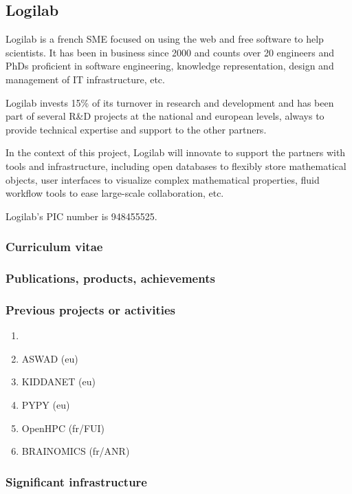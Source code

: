 \subsection*{Logilab}

Logilab is a french SME focused on using the web and free software to help
scientists. It has been in business since 2000 and counts over 20 engineers and
PhDs proficient in software engineering, knowledge representation, design and
management of IT infrastructure, etc.

Logilab invests 15\% of its turnover in research and development and has been
part of several R&D projects at the national and european levels, always to
provide technical expertise and support to the other partners.

In the context of this project, Logilab will innovate to support the partners
with tools and infrastructure, including open databases to flexibly store
mathematical objects, user interfaces to visualize complex mathematical
properties, fluid workflow tools to ease large-scale collaboration, etc.

Logilab's PIC number is 948455525.


\subsubsection*{Curriculum vitae}


%
%
%

\subsubsection*{Publications, products, achievements}


\subsubsection*{Previous projects or activities}

\begin{enumerate}
\item {}
\item ASWAD (eu)
\item KIDDANET (eu)
\item PYPY (eu)
\item OpenHPC (fr/FUI)
\item BRAINOMICS (fr/ANR)
\end{enumerate}

\subsubsection*{Significant infrastructure}

